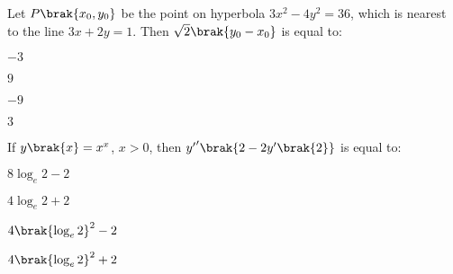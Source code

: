 \item Let $P\brak{x_0,y_0}$ be the point on hyperbola $3x^2-4y^2=36$, which is nearest to the line $3x+2y=1$. Then $\sqrt{2}\brak{y_0-x_0}$ is equal to:
\hfill{}
\begin{enumerate}
\begin{multicols}{4}
\item $-3$
\item $9$
\item $-9$
\item $3$
\end{multicols}
\end{enumerate}

\item If $y\brak{x}=x^x$, $x>0$, then ${y^\prime}^\prime\brak{2-2y^\prime\brak{2}}$ is equal to:

\hfill{}
\begin{enumerate}
\begin{multicols}{4}
\item $8\log_e{2}-2$
\item $4\log_e{2}+2$
\item $4\brak{\log_e{2}}^2-2$
\item $4\brak{\log_e{2}}^2+2$
\end{multicols}
\end{enumerate}
